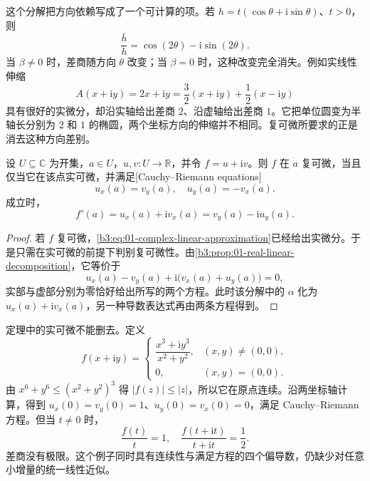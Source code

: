 这个分解把方向依赖写成了一个可计算的项。若
\(h=t(\cos\theta+\mathrm{i}\sin\theta)\)、\(t>0\)，则
\[
 \frac{\overline h}{h}=\cos(2\theta)-\mathrm{i}\sin(2\theta).
\]
当 \(\beta\ne0\) 时，差商随方向 \(\theta\) 改变；当 \(\beta=0\) 时，这种改变完全消失。例如实线性伸缩
\[
 A(x+\mathrm{i}y)=2x+\mathrm{i}y
 =\frac32(x+\mathrm{i}y)+\frac12(x-\mathrm{i}y)
\]
具有很好的实微分，却沿实轴给出差商 \(2\)、沿虚轴给出差商 \(1\)。它把单位圆变为半轴长分别为 \(2\) 和 \(1\) 的椭圆，两个坐标方向的伸缩并不相同。复可微所要求的正是消去这种方向差别。

\begin{theorem}\label{b3:thm:01-cauchy-riemann-criterion}
设 \(U\subseteq\mathbb C\) 为开集，\(a\in U\)，\(u,v:U\to\mathbb R\)，并令 \(f=u+\mathrm{i}v\)。则 \(f\) 在 \(a\) 复可微，当且仅当它在该点实可微，并满足[Cauchy--Riemann equations]
\begin{equation}\label{b3:eq:01-cauchy-riemann}
 u_x(a)=v_y(a),\quad u_y(a)=-v_x(a).
\end{equation}
成立时，
\[
 f'(a)=u_x(a)+\mathrm{i}v_x(a)=v_y(a)-\mathrm{i}u_y(a).
\]
\end{theorem}
\begin{proof}
若 \(f\) 复可微，\eqref{b3:eq:01-complex-linear-approximation}已经给出实微分。于是只需在实可微的前提下判别复可微性。由\cref{b3:prop:01-real-linear-decomposition}，它等价于
\[
 u_x(a)-v_y(a)+\mathrm{i}\bigl(v_x(a)+u_y(a)\bigr)=0,
\]
实部与虚部分别为零恰好给出所写的两个方程。此时该分解中的 \(\alpha\) 化为 \(u_x(a)+\mathrm{i}v_x(a)\)，另一种导数表达式再由两条方程得到。
\end{proof}

定理中的实可微不能删去。定义
\[
 f(x+\mathrm{i}y)=
 \begin{cases}
 \dfrac{x^3+\mathrm{i}y^3}{x^2+y^2},&(x,y)\ne(0,0),\\[4pt]
 0,&(x,y)=(0,0).
 \end{cases}
\]
由 \(x^6+y^6\leq(x^2+y^2)^3\) 得 \(\lvert f(z)\rvert\leq\lvert z\rvert\)，所以它在原点连续。沿两坐标轴计算，得到 \(u_x(0)=v_y(0)=1\)、\(u_y(0)=v_x(0)=0\)，满足 Cauchy--Riemann 方程。但当 \(t\ne0\) 时，
\[
 \frac{f(t)}t=1,\quad
 \frac{f(t+\mathrm{i}t)}{t+\mathrm{i}t}=\frac12.
\]
差商没有极限。这个例子同时具有连续性与满足方程的四个偏导数，仍缺少对任意小增量的统一线性近似。

